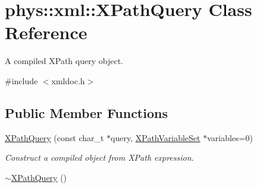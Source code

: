 \hypertarget{classphys_1_1xml_1_1XPathQuery}{
\section{phys::xml::XPathQuery Class Reference}
\label{de/d52/classphys_1_1xml_1_1XPathQuery}
}


A compiled XPath query object.  




{\ttfamily \#include $<$xmldoc.h$>$}

\subsection*{Public Member Functions}
\begin{DoxyCompactItemize}
\item 
\hyperlink{classphys_1_1xml_1_1XPathQuery_a1a63135370ef4999f3dd27540c9009a2}{XPathQuery} (const char\_\-t $\ast$query, \hyperlink{classphys_1_1xml_1_1XPathVariableSet}{XPathVariableSet} $\ast$variables=0)
\begin{DoxyCompactList}\small\item\em Construct a compiled object from XPath expression. \item\end{DoxyCompactList}\item 
\hypertarget{classphys_1_1xml_1_1XPathQuery_a063a1c4513d62695ae73c981f2050dc4}{
\hyperlink{classphys_1_1xml_1_1XPathQuery_a063a1c4513d62695ae73c981f2050dc4}{$\sim$XPathQuery} ()}
\label{de/d52/classphys_1_1xml_1_1XPathQuery_a063a1c4513d62695ae73c981f2050dc4}


\end{DoxyCompactItemize}
